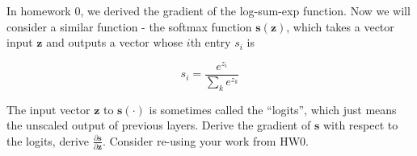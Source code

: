 
In homework 0, we derived the gradient of the log-sum-exp function. Now we will consider a similar function - the softmax function $\mathbf{s}(\mathbf{z})$, which takes a vector input $\mathbf{z}$ and outputs a vector whose $i$th entry $s_i$ is

\begin{equation}
s_i = \frac{e^{z_{i}}}{\sum_{k} e^{z_{k}}}
\end{equation}

The input vector $\mathbf{z}$ to $\mathbf{s}(\cdot)$ is sometimes called the ``logits'', which just means the unscaled output of previous layers. Derive the gradient of $\mathbf{s}$ with respect to the logits, \ie derive $\frac{\partial \mathbf{s}}{\partial \mathbf{z}}$. 
Consider re-using your work from HW0.